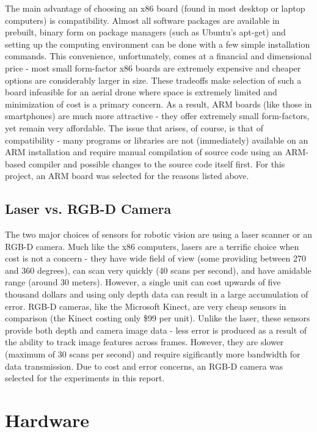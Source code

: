 \documentclass[letterpaper, oneside, 10pt]{report}
\begin{document}
The main advantage of choosing an x86 board (found in most desktop or laptop computers) is compatibility. Almost all software packages are available in prebuilt, binary form on package managers (such as Ubuntu's apt-get) and setting up the computing environment can be done with a few simple installation commands. This convenience, unfortunately, comes at a financial and dimensional price - most small form-factor x86 boards are extremely expensive and cheaper options are considerably larger in size. These tradeoffs make selection of such a board infeasible for an aerial drone where space is extremely limited and minimization of cost is a primary concern. As a result, ARM boards (like those in smartphones) are much more attractive - they offer extremely small form-factors, yet remain very affordable. The issue that arises, of course, is that of compatibility - many programs or libraries are not (immediately) available on an ARM installation and require manual compilation of source code using an ARM-based compiler and possible changes to the source code itself first. For this project, an ARM board was selected for the reasons listed above.

\subsection{Laser vs. RGB-D Camera}

The two major choices of sensors for robotic vision are using a laser scanner or an RGB-D camera. Much like the x86 computers, lasers are a terrific choice when cost is not a concern - they have wide field of view (some providing between 270 and 360 degrees), can scan very quickly (40 scans per second), and have amidable range (around 30 meters). However, a single unit can cost upwards of five thousand dollars and using only depth data can result in a large accumulation of error. RGB-D cameras, like the Microsoft Kinect, are very cheap sensors in comparison (the Kinect costing only \$99 per unit). Unlike the laser, these sensors provide both depth and camera image data - less error is produced as a result of the ability to track image features across frames. However, they are slower (maximum of 30 scans per second) and require sigificantly more bandwidth for data transmission. Due to cost and error concerns, an RGB-D camera was selected for the experiments in this report.

\section{Hardware}
\end{document}
